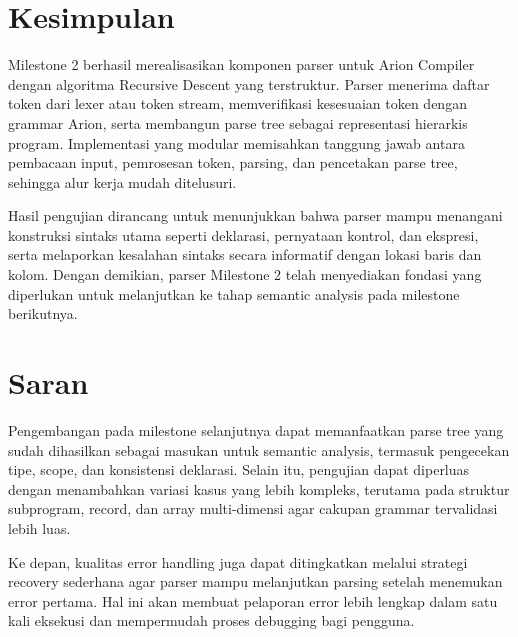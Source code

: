 \section{Kesimpulan}
Milestone 2 berhasil merealisasikan komponen parser untuk Arion Compiler dengan 
algoritma Recursive Descent yang terstruktur. Parser menerima daftar token dari 
lexer atau token stream, memverifikasi kesesuaian token dengan grammar Arion, 
serta membangun parse tree sebagai representasi hierarkis program. Implementasi 
yang modular memisahkan tanggung jawab antara pembacaan input, pemrosesan token, 
parsing, dan pencetakan parse tree, sehingga alur kerja mudah ditelusuri.

Hasil pengujian dirancang untuk menunjukkan bahwa parser mampu menangani konstruksi 
sintaks utama seperti deklarasi, pernyataan kontrol, dan ekspresi, serta melaporkan 
kesalahan sintaks secara informatif dengan lokasi baris dan kolom. Dengan demikian, 
parser Milestone 2 telah menyediakan fondasi yang diperlukan untuk melanjutkan ke 
tahap semantic analysis pada milestone berikutnya.

\section{Saran}
Pengembangan pada milestone selanjutnya dapat memanfaatkan parse tree yang sudah 
dihasilkan sebagai masukan untuk semantic analysis, termasuk pengecekan tipe, 
scope, dan konsistensi deklarasi. Selain itu, pengujian dapat diperluas dengan 
menambahkan variasi kasus yang lebih kompleks, terutama pada struktur subprogram, 
record, dan array multi-dimensi agar cakupan grammar tervalidasi lebih luas.

Ke depan, kualitas error handling juga dapat ditingkatkan melalui strategi 
recovery sederhana agar parser mampu melanjutkan parsing setelah menemukan 
error pertama. Hal ini akan membuat pelaporan error lebih lengkap dalam satu 
kali eksekusi dan mempermudah proses debugging bagi pengguna.
